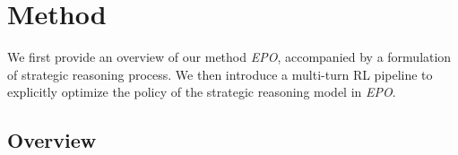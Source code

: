 \section{Method}
We first provide an overview of our method \textit{EPO}, accompanied by a formulation of strategic reasoning process. 
We then introduce a multi-turn RL pipeline to explicitly optimize the policy of the strategic reasoning model in \textit{EPO}.



\subsection{Overview}


